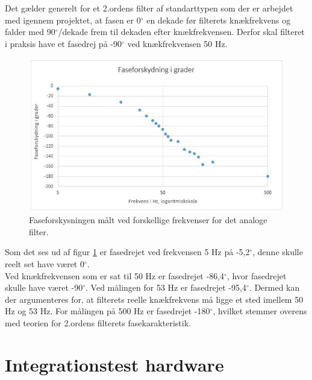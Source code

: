 Det gælder generelt for et 2.ordens filter af standarttypen som der er arbejdet med igennem projektet, at fasen er 0$^{\circ}$ en dekade før filterets knækfrekvens og falder med 90$^{\circ}$/dekade frem til dekaden efter knækfrekvensen. Derfor skal filteret i praksis have et fasedrej på -90$^{\circ}$ ved knækfrekvensen 50 Hz.\\ 
\begin{figure}[H]
	\centering
	\includegraphics[width=1\textwidth]{Figurer/Hardware/FaseforskydningFilter}
	\caption{Faseforskysningen målt ved forskellige frekvenser for det analoge filter.}
	\label{fig:FilterFaseforskydning}
\end{figure}

Som det ses ud af figur \ref{fig:FilterFaseforskydning} er fasedrejet ved frekvensen 5 Hz på -5,2$^{\circ}$, denne skulle reelt set have været 0$^{\circ}$. \\
Ved knækfrekvensen som er sat til 50 Hz er fasedrejet -86,4$^{\circ}$, hvor fasedrejet skulle have været -90$^{\circ}$. Ved målingen for 53 Hz er fasedrejet -95,4$^{\circ}$. Dermed kan der argumenteres for, at filterets reelle knækfrekvens må ligge et sted imellem 50 Hz og 53 Hz. 
For målingen på 500 Hz er fasedrejet -180$^{\circ}$, hvilket stemmer overens med teorien for 2.ordens filterets fasekarakteristik.

\section{Integrationstest hardware}

